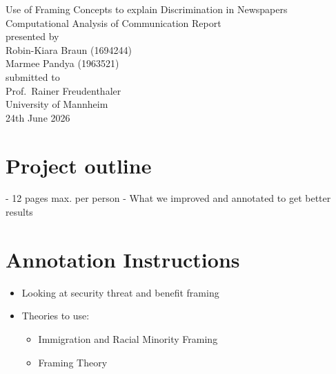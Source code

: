 \documentclass[11pt,titlepage,oneside,openany]{article}
\begin{document}
\begin{titlepage}
	\vspace*{2cm}
  \begin{center}
    {\Large Use of Framing Concepts to explain Discrimination in Newspapers\\}
    \vspace{2cm} 
   {Computational Analysis of Communication Report\\}
   \vspace{1.5cm}
   {presented by\\
   Robin-Kiara Braun (1694244)\\
   Marmee Pandya (1963521) \\
   }
   \vspace{1cm} 
   {submitted to \\
    Prof.\ Rainer Freudenthaler\\
    University of Mannheim\\} \vspace{2cm}
   {24th June 2026}
  \end{center}
\end{titlepage} 















\section{Project outline}
\label{cha:businessUnderstanding}

- 12 pages max. per person 
- What we improved and annotated to get better results 


\section{Annotation Instructions}
\label{cha:Instructions LLM}
\begin{itemize}
    \item Looking at security threat and benefit framing
    \item Theories to use: 
    \begin{itemize}
        \item Immigration and Racial Minority Framing
        \item Framing Theory
    \end{itemize}
\end{itemize}
\end{document}
